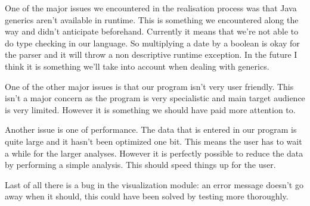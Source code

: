 One of the major issues we encountered in the realisation process was that Java generics aren't available in runtime. This is something we encountered along the way and didn't anticipate beforehand. Currently it means that we're not able to do type checking in our language. So multiplying a date by a boolean is okay for the parser and it will throw a non descriptive runtime exception. In the future I think it is something we'll take into account when dealing with generics.

One of the other major issues is that our program isn't very user friendly. This isn't a major concern as the program is very specialistic and main target audience is very limited. However it is something we should have paid more attention to. 

Another issue is one of performance. The data that is entered in our program is quite large and it  hasn't been optimized one bit. This means the user has to wait a while for the larger analyses. However it is perfectly possible to reduce the data by performing a simple analysis. This should speed things up for the user.

Last of all there is a bug in the visualization module: an error message doesn't go away when it should, this could have been solved by testing more thoroughly.
